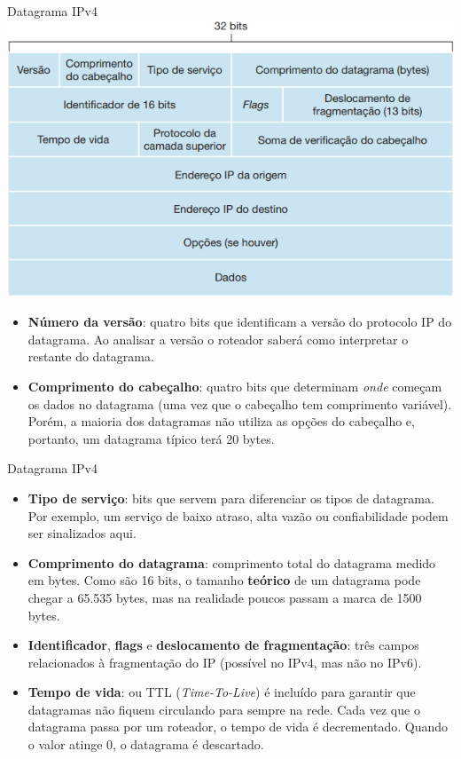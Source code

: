 \documentclass{libs/ufc_format}
\begin{document}
\begin{frame}{Datagrama IPv4}
    \centering
    \includegraphics[scale=0.45]{figuras/figura10_01}
    \begin{itemize}
        \footnotesize
        \justifying
        \item \textbf{Número da versão}: quatro bits que identificam a versão do protocolo IP do datagrama. Ao analisar a versão o roteador saberá como interpretar o restante do datagrama.
        \item<2> \textbf{Comprimento do cabeçalho}: quatro bits que determinam \textit{onde} começam os dados no datagrama (uma vez que o cabeçalho tem comprimento variável). Porém, a maioria dos datagramas não utiliza as opções do cabeçalho e, portanto, um datagrama típico terá 20 bytes.
    \end{itemize}
\end{frame}

\begin{frame}{Datagrama IPv4}
    \begin{itemize}
        \justifying
        \item \textbf{Tipo de serviço}: bits que servem para diferenciar os tipos de datagrama. Por exemplo, um serviço de baixo atraso, alta vazão ou confiabilidade podem ser sinalizados aqui.
        \item<2-> \textbf{Comprimento do datagrama}: comprimento total do datagrama medido em bytes. Como são 16 bits, o tamanho \textbf{teórico} de um datagrama pode chegar a 65.535 bytes, mas na realidade poucos passam a marca de 1500 bytes.
        \item<3-> \textbf{Identificador}, \textbf{flags} e \textbf{deslocamento de fragmentação}: três campos relacionados à fragmentação do IP (possível no IPv4, mas não no IPv6).
        \item<4-> \textbf{Tempo de vida}: ou TTL (\textit{Time-To-Live}) é incluído para garantir que datagramas não fiquem circulando para sempre na rede. Cada vez que o datagrama passa por um roteador, o tempo de vida é decrementado. Quando o valor atinge 0, o datagrama é descartado.
    \end{itemize}
\end{frame}
\end{document}

